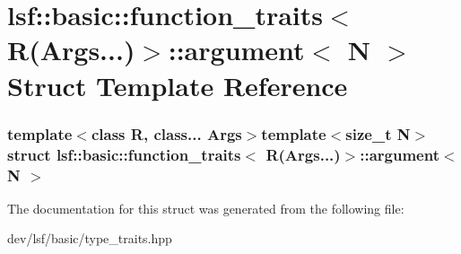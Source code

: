 \hypertarget{structlsf_1_1basic_1_1function__traits_3_01R_07Args_8_8_8_08_4_1_1argument}{
\section{lsf::basic::function\_\-traits$<$ R(Args...)$>$::argument$<$ N $>$ Struct Template Reference}
\label{structlsf_1_1basic_1_1function__traits_3_01R_07Args_8_8_8_08_4_1_1argument}
}
\subsubsection*{template$<$class R, class... Args$>$template$<$size\_\-t N$>$ struct lsf::basic::function\_\-traits$<$ R(Args...)$>$::argument$<$ N $>$}



The documentation for this struct was generated from the following file:\begin{DoxyCompactItemize}
\item 
dev/lsf/basic/type\_\-traits.hpp\end{DoxyCompactItemize}
